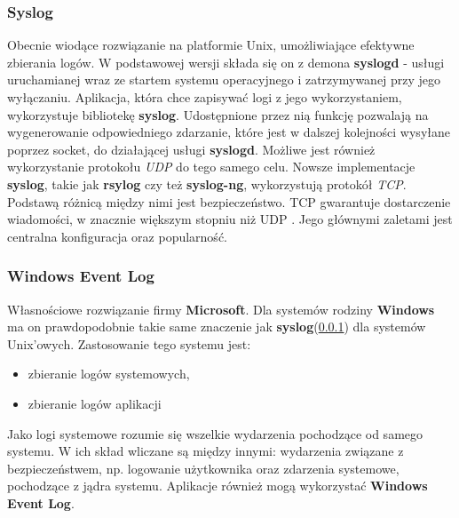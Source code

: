         \subsubsection{Syslog}
        \label{chapter:logs:collecting:source:syslog}
        Obecnie wiodące rozwiązanie na platformie Unix, umożliwiające efektywne zbierania logów. 
        W podstawowej wersji składa się on z demona \textbf{syslogd} - usługi
        uruchamianej wraz ze startem systemu operacyjnego i zatrzymywanej przy jego wyłączaniu. 
        Aplikacja, która chce zapisywać logi z jego wykorzystaniem, wykorzystuje bibliotekę \textbf{syslog}.
        Udostępnione przez nią funkcję pozwalają na wygenerowanie odpowiedniego zdarzanie, które jest
        w dalszej kolejności wysyłane poprzez socket, do działającej usługi \textbf{syslogd}. Możliwe jest
        również wykorzystanie protokołu \textit{UDP} do tego samego celu.
        Nowsze implementacje \textbf{syslog}, takie jak \textbf{rsylog} czy też \textbf{syslog-ng}, 
        wykorzystują protokół \textit{TCP}. Podstawą różnicą między nimi jest bezpieczeństwo. TCP
        gwarantuje dostarczenie wiadomości, w znacznie większym stopniu niż UDP \cite{logging_log_management}.
        Jego głównymi zaletami jest centralna konfiguracja oraz popularność.
        
        \subsubsection{Windows Event Log}
        \label{chapter:logs:collecting:source:windows_event_log}
        Własnościowe rozwiązanie firmy \textbf{Microsoft}. Dla systemów rodziny \textbf{Windows}
        ma on prawdopodobnie takie same znaczenie jak \textbf{syslog}(\ref{chapter:logs:collecting:source:syslog})
        dla systemów Unix'owych. Zastosowanie tego systemu jest:
        \begin{itemize}
            \item zbieranie logów systemowych,
            \item zbieranie logów aplikacji
        \end{itemize}
        Jako logi systemowe rozumie się wszelkie wydarzenia pochodzące od samego systemu. W ich skład
        wliczane są między innymi: wydarzenia związane z bezpieczeństwem, np. 
        logowanie użytkownika oraz zdarzenia systemowe, pochodzące z jądra systemu. Aplikacje
        również mogą wykorzystać \textbf{Windows Event Log}.
        
